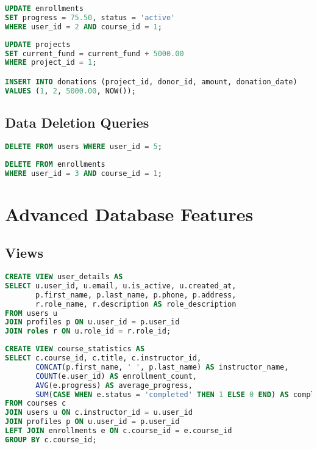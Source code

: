 \documentclass[12pt]{report}
\begin{document}
    \begin{lstlisting}[language=SQL, caption=Update Course Progress]
UPDATE enrollments 
SET progress = 75.50, status = 'active'
WHERE user_id = 2 AND course_id = 1;
    \end{lstlisting}
    
    \begin{lstlisting}[language=SQL, caption=Record a Donation to a Project]
UPDATE projects 
SET current_fund = current_fund + 5000.00
WHERE project_id = 1;

INSERT INTO donations (project_id, donor_id, amount, donation_date)
VALUES (1, 2, 5000.00, NOW());
    \end{lstlisting}
    
    \section{Data Deletion Queries}
    \begin{lstlisting}[language=SQL, caption=Delete a User Account]
DELETE FROM users WHERE user_id = 5;
    \end{lstlisting}
    
    \begin{lstlisting}[language=SQL, caption=Remove a User from a Course]
DELETE FROM enrollments 
WHERE user_id = 3 AND course_id = 1;
    \end{lstlisting}
    
    \chapter{Advanced Database Features}
    
    \section{Views}
    \begin{lstlisting}[language=SQL, caption=Creating a View for User Details]
CREATE VIEW user_details AS
SELECT u.user_id, u.email, u.is_active, u.created_at,
       p.first_name, p.last_name, p.phone, p.address,
       r.role_name, r.description AS role_description
FROM users u
JOIN profiles p ON u.user_id = p.user_id
JOIN roles r ON u.role_id = r.role_id;
    \end{lstlisting}
    
    \begin{lstlisting}[language=SQL, caption=Creating a View for Course Statistics]
CREATE VIEW course_statistics AS
SELECT c.course_id, c.title, c.instructor_id,
       CONCAT(p.first_name, ' ', p.last_name) AS instructor_name,
       COUNT(e.user_id) AS enrollment_count,
       AVG(e.progress) AS average_progress,
       SUM(CASE WHEN e.status = 'completed' THEN 1 ELSE 0 END) AS completed_count
FROM courses c
JOIN users u ON c.instructor_id = u.user_id
JOIN profiles p ON u.user_id = p.user_id
LEFT JOIN enrollments e ON c.course_id = e.course_id
GROUP BY c.course_id;
    \end{lstlisting}
    
\end{document}
